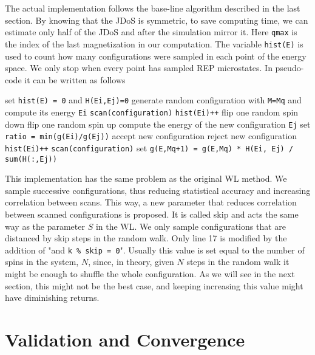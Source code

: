 	The actual implementation follows the base-line algorithm described in the last section. By knowing that the JDoS is symmetric, to save computing time, we can estimate only half of the JDoS and after the simulation mirror it. Here \texttt{qmax} is the index of the last magnetization in our computation. The variable \texttt{hist(E)} is used to count how many configurations were sampled in each point of the energy space. We only stop when every point has sampled REP microstates. In pseudo-code it can be written as follows 
	
\begin{algorithm}
	\begin{algorithmic}[1]
		 	\State set \texttt{hist(E) = 0} and \texttt{H(Ei,Ej)=0}
		 	\State generate random configuration with \texttt{M=Mq} and compute its energy \texttt{Ei}
		 	\State \texttt{scan(configuration)}
		 	\State \texttt{hist(Ei)++}
		 		\State flip one random spin down
		 		\State flip one random spin up
		 		\State compute the energy of the new configuration \texttt{Ej}
		 		\State set \texttt{ratio = min(g(Ei)/g(Ej))}
					\State accept new configuration
				\Else
					\State reject new configuration
		 		\EndIf
		 			\State \texttt{hist(Ei)++}
			 		\State \texttt{scan(configuration)}
		 		\EndIf
		 	\EndWhile
		 	\State set \texttt{g(E,Mq+1) = g(E,Mq) * H(Ei, Ej) / sum(H(:,Ej))} 
		 \EndFor
	\end{algorithmic} 
\end{algorithm}

	This implementation has the same problem as the original WL method. We sample successive configurations, thus reducing statistical accuracy and increasing correlation between scans. This way, a new parameter that reduces correlation between scanned configurations is proposed. It is called skip and acts the same way as the parameter $S$ in the WL. We only sample configurations that are distanced by skip steps in the random walk. Only line 17 is modified by the addition of "and \texttt{k \% skip = 0}". Usually this value is set equal to the number of spins in the system, $N$, since, in theory, given $N$ steps in the random walk it might be enough to shuffle the whole configuration. As we will see in the next section, this might not be the best case, and keeping increasing this value might have diminishing returns.
	
\section{Validation and Convergence}

